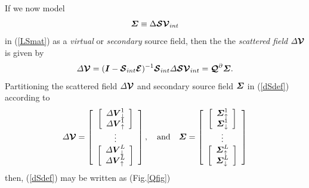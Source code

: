 If we now model 
\[
{\bmi \Sigma} \equiv\Delta {\CB  S}{\CB  V}_{{int}}
\] 
in (\ref{LSmat}) as a {\em virtual \/} or {\em secondary\/} source 
field, then the the {\em scattered field\/} ${\mit \Delta}{\CB V}$ is given by
\begin{equation} \label{dSdef}
{\mit \Delta}{\CB V}=
({\bmi  I}-{\CB  S}_{{int}}{\CB  E})^{-1}{\CB  S}_{{int}} {\mit \Delta} 
{\CB  S}{\CB  V}_{{int}}=
{\CB Q}^{\partial}{\bmi \Sigma}.
\end{equation}
Partitioning the scattered field ${\mit \Delta}  { \CB V}$ and secondary source field
${\bmi \Sigma}$ in (\ref{dSdef}) according to
\begin{equation} \label{delVandSig}
 {\mit \Delta}  { \CB V}=\left[{\begin{array}{c}\left[{\begin{array}{c} 
{\mit \Delta} {  \bmi V}_{\downarrow }^{  1}\\ {\mit \Delta} {  
\bmi V}_{\uparrow }^{  1}\end{array}}\right]\\ \vdots\\ 
\left[{\begin{array}{c} {\mit \Delta} {  \bmi V}_{\downarrow }^{  
L}\\ {\mit \Delta} {\bmi  V}_{\uparrow }^{  
L}\end{array}}\right]\end{array}}\right] , \quad \mbox{and} \quad
 {\bmi \Sigma}=\left[{\begin{array}{c}\left[{\begin{array}{c}
{\bmi \Sigma}_{\uparrow }^{  1}\\
{\bmi \Sigma}_{\downarrow }^{  1}\end{array}}\right]\\
\vdots\\
\left[{\begin{array}{c} {\bmi \Sigma}_{\uparrow }^{  L}\\
{\bmi \Sigma}_{\downarrow }^{  L}\end{array}}\right]\end{array}}\right]
\end{equation}
then,  (\ref{dSdef}) may be written as  (Fig.\ref{Qfig})
